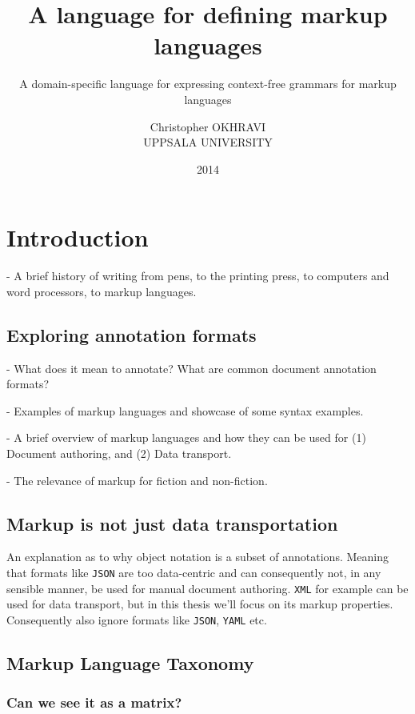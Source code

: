 \documentclass{scrreprt}
\date{2014}
\title{ A language for defining markup languages }
\subtitle{ A domain-specific language for expressing context-free grammars for markup languages }
\author{ Christopher OKHRAVI \\ UPPSALA UNIVERSITY }
\begin{document}
\maketitle
\tableofcontents
\pagebreak



\glsaddall
\printglossary





\chapter{Introduction}

- A brief history of writing from pens, to the printing press, to computers and word processors, to markup languages.
 


\section{Exploring annotation formats}

- What does it mean to annotate? What are common document annotation formats?

- Examples of markup languages and showcase of some syntax examples.

- A brief overview of markup languages and how they can be used for (1) Document authoring, and (2) Data transport.

- The relevance of markup for fiction and non-fiction.



\section{Markup is not just data transportation}
An explanation as to why object notation is a subset of annotations. Meaning that formats like \texttt{JSON} are too data-centric and can consequently not, in any sensible manner, be used for manual document authoring. \texttt{XML} for example can be used for data transport, but in this thesis we'll focus on its markup properties. Consequently also ignore formats like \texttt{JSON}, \texttt{YAML} etc.






\section{Markup Language Taxonomy}

\subsection{Can we see it as a matrix?}
\end{document}
